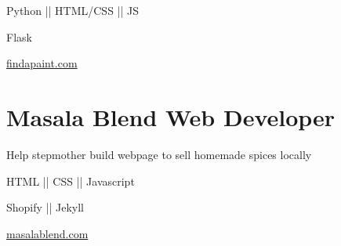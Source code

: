\begin{subtitle}
    \vspace{-5ex}
    {{}} 
\end{subtitle}

\vspace{-1.5ex}
{
    \vspace{-0.8ex}
    \color{cyan}\small
    {Python || HTML/CSS || JS}
}

{
    \vspace{-2.5ex}\hspace{1.5in}
    \color{cyan}\small
    {Flask}
}

{
    \vspace{-2.5ex}\hspace{3in}
    \color{blue}\small
    {\href{https://www.findapaint.com}{findapaint.com}{}}
}

\vspace{2.5ex}


\section{
    \textbf{Masala Blend} \newline
    Web Developer
}{}


\vspace{-2.5ex}

\begin{detail}
    \BulletItem
    Help stepmother build webpage to sell homemade spices locally
\end{detail}

\begin{subtitle}
    \vspace{-5ex}
    {{}} 
\end{subtitle}

\vspace{-1.5ex}
{
    \vspace{-0.8ex}
    \color{cyan}\small
    {HTML || CSS || Javascript}
}

{
    \vspace{-2.5ex}\hspace{1.5in}
    \color{cyan}\small
    {Shopify || Jekyll}
}

{
    \vspace{-2.5ex}\hspace{3in}
    \color{blue}\small
    {\href{https://masalablend.com}{masalablend.com}{}}
}

